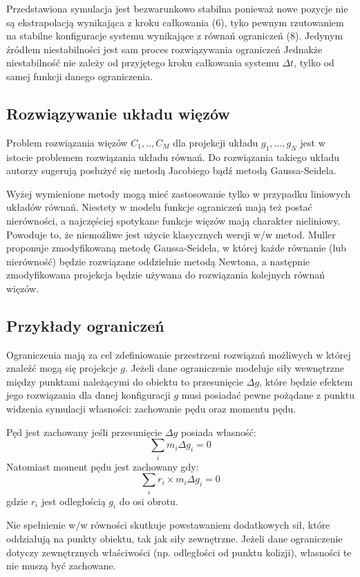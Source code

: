 Przedstawiona symulacja jest bezwarunkowo stabilna \cite{pbdyn} ponieważ nowe pozycje nie są
ekstrapolacją wynikająca z kroku całkowania (6), tyko pewnym rzutowaniem na
stabilne konfiguracje systemu wynikające z równań ograniczeń (8). Jedynym
źródłem niestabilności jest sam proces rozwiązywania ograniczeń \cite{pbdyn}
Jednakże niestabilność nie zależy od przyjętego kroku całkowania systemu $\Delta
t$, tylko od samej funkcji danego ograniczenia\cite{pbdyn}.

\subsection{Rozwiązywanie układu więzów}
Problem rozwiązania więzów $C_1, .., C_M$ dla projekcji układu $g_1, ..., g_N$
jest w istocie problemem rozwiązania układu równań. Do rozwiązania takiego
układu autorzy sugerują posłużyć się metodą Jacobiego bądź metodą Gaussa-Seidela. 

Wyżej wymienione metody mogą mieć zastosowanie tylko w przypadku
liniowych układów równań. Niestety w modelu funkcje ograniczeń mają też postać nierówności, a
najczęściej spotykane funkcje więzów mają charakter nieliniowy. Powoduje to,
że niemożliwe jest użycie klasycznych wersji w/w metod. Muller proponuje
zmodyfikowaną metodę Gaussa-Seidela, w której każde równanie (lub nierówność) będzie rozwiązane
oddzielnie metodą Newtona, a następnie zmodyfikowana projekcja będzie używana do
rozwiązania kolejnych równań więzów.

\subsection{Przykłady ograniczeń}
Ograniczenia mają za cel zdefiniowanie przestrzeni rozwiązań możliwych w której
znaleźć mogą się projekcje $g$.  Jeżeli dane ograniczenie modeluje siły
wewnętrzne między punktami należącymi do obiektu to przesunięcie $\Delta g$,
	które będzie efektem jego rozwiązania dla danej konfiguracji $g$ musi
	posiadać pewne pożądane z punktu widzenia symulacji własności: zachowanie
	pędu oraz momentu pędu.

Pęd jest zachowany jeśli przesunięcie $\Delta g$ posiada własność:
$$ \sum_i m_i \Delta g_i = 0$$
Natomiast moment pędu jest zachowany gdy:
$$ \sum_i r_i \times m_i \Delta g_i = 0$$
gdzie $r_i$ jest odległością $g_i$ do osi
obrotu.

Nie spełnienie w/w równości skutkuje powstawaniem dodatkowych sił, które
oddziałują na punkty obiektu, tak jak siły zewnętrzne. Jeżeli dane ograniczenie
dotyczy zewnętrznych właściwości (np. odległości od punktu kolizji),
własności te nie muszą być zachowane\cite{pbdyn}.

